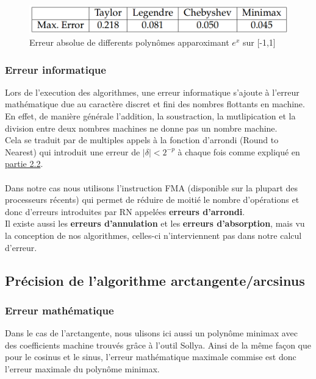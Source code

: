 \documentclass[12pt]{article}
\begin{document}
\begin{figure}[ht]
    \begin{center}
      \includegraphics[scale=0.28]{ComparaisonPoly.png}
      \caption{Erreur absolue de differents polynômes apparoximant $e^x$ sur [-1,1]}
      \label{Erreur absolue de differents polynômes apparoximant $e^x$ sur [-1,1]}
    \end{center}
\end{figure}



\subsubsection{Erreur informatique}

Lors de l'execution des algorithmes, une erreur informatique s'ajoute à l'erreur mathématique due au caractère
discret et fini des nombres flottants en machine. En effet, de manière générale l'addition, la soustraction, la mutlipication
et la division entre deux nombres machines ne donne pas un nombre machine. \\
Cela se traduit par de multiples appels à la fonction d'arrondi (Round to Nearest) qui introduit une erreur
de $|\delta| < 2^{-p}$ à chaque fois comme expliqué en \hyperref[sec:arrondis]{partie 2.2}. \\ \\
Dans notre cas nous utilisons l'instruction FMA (disponible sur la plupart des processeurs récents) qui permet
de réduire de moitié le nombre d'opérations et donc d'erreurs introduites par RN appelées \textbf{erreurs d'arrondi}.
\\
Il existe aussi les \textbf{erreurs d'annulation} et les \textbf{erreurs d'absorption}, mais vu la conception
de nos algorithmes, celles-ci n'interviennent pas dans notre calcul d'erreur.

\subsection{Précision de l'algorithme arctangente/arcsinus}
\subsubsection{Erreur mathématique}

Dans le cas de l'arctangente, nous ulisons ici aussi un polynôme minimax avec des coefficients machine trouvés grâce à l'outil Sollya.
Ainsi de la même façon que pour le cosinus et le sinus, l'erreur mathématique maximale commise est donc l'erreur maximale du polynôme minimax.
\end{document}
